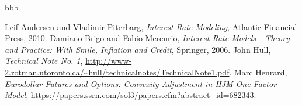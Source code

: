 \documentclass[12pt]{article}
\begin{document}
  bbb



\begin{thebibliography}{1}

   Leif Andersen and Vladimir Piterbarg, {\it Interest Rate Modeling}, Atlantic Financial Press, 2010.
   Damiano Brigo and Fabio Mercurio, {\it Interest Rate Models - Theory and Practice: With Smile, Inflation and Credit}, Springer, 2006.
   John Hull, {\it Technical Note No. 1}, \url{http://www-2.rotman.utoronto.ca/~hull/technicalnotes/TechnicalNote1.pdf}.
   Marc Henrard, {\it Eurodollar Futures and Options: Convexity Adjustment in HJM One-Factor Model},
                \url{https://papers.ssrn.com/sol3/papers.cfm?abstract_id=682343}.


\end{thebibliography}
\end{document}
